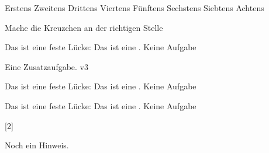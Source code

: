 \documentclass[a4paper,12pt]{scrartcl}
\begin{document}

    \begin{aufgabe}[points=3,subtitle=Eine Kreuzchenaufgabe]
        \begin{mcumgebung} %
            \choice Erstens
            \choice Zweitens
            \choice Drittens
            \choice[\mcrichtig] Viertens
            \choice Fünftens
            \choice[\mcrichtig] Sechstens
            \choice Siebtens
            \choice[\mcrichtig] Achtens
        \end{mcumgebung}
        \begin{loesung}
            \mcloesung
        \end{loesung}
        \begin{bearbeitungshinweis}
            Mache die Kreuzchen an der richtigen Stelle
        \end{bearbeitungshinweis}
    \end{aufgabe}


    \begin{aufgabe}[symbol=\symBleistift]
        \begin{teilaufgaben}
            \teilaufgabe[2] Das ist eine feste Lücke: \luecke[style={\uwave{#1}}]{2cm}
            \teilaufgabe[3] Das ist eine .
            \teilaufgabe[20] Keine Aufgabe
        \end{teilaufgaben}
    \end{aufgabe}

    \begin{aufgabe*}[points=10,]
        Eine Zusatzaufgabe. v3

        \begin{teilaufgaben}
            \teilaufgabe Das ist eine feste Lücke: \luecke[style={\uwave{#1}}]{2cm}
            \teilaufgabe Das ist eine .
            \teilaufgabe Keine Aufgabe
        \end{teilaufgaben}

        \begin{loesung*}
        \begin{teilaufgaben}
            \teilaufgabe Das ist eine feste Lücke: \luecke[style={\uwave{#1}}]{2cm}
            \teilaufgabe Das ist eine .
            \teilaufgabe Keine Aufgabe
        \end{teilaufgaben}

        \end{loesung*}
        [2]
        \begin{bearbeitungshinweis}
            Noch ein Hinweis.
        \end{bearbeitungshinweis}
    \end{aufgabe*}
\end{document}
